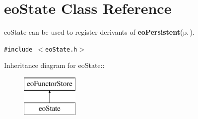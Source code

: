 \section{eo\-State Class Reference}
\label{classeo_state}
eo\-State can be used to register derivants of {\bf eo\-Persistent}{\rm (p.\,\pageref{classeo_persistent})}.  


{\tt \#include $<$eo\-State.h$>$}

Inheritance diagram for eo\-State::\begin{figure}[H]
\begin{center}
\leavevmode
\includegraphics[height=2cm]{classeo_state}
\end{center}
\end{figure}
